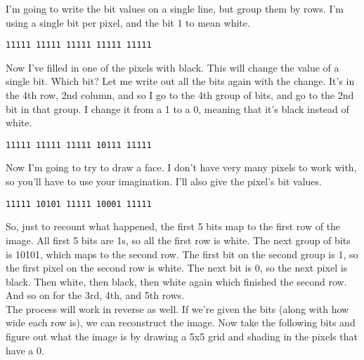 \begin{center}\end{center}

I'm going to write the bit values on a single line, but group them by rows. I'm using a single bit per pixel, and the bit 1 to mean white.\\

\begin{verbatim}
11111 11111 11111 11111 11111
\end{verbatim}

Now I've filled in one of the pixels with black. This will change the value of a single bit. Which bit? Let me write out all the bits again with the change. It's in the 4th row, 2nd column, and so I go to the 4th group of bits, and go to the 2nd bit in that group. I change it from a 1 to a 0, meaning that it's black instead of white.\\

\begin{center}\end{center}

\begin{verbatim}
11111 11111 11111 10111 11111
\end{verbatim}

Now I'm going to try to draw a face. I don't have very many pixels to work with, so you'll have to use your imagination. I'll also give the pixel's bit values.

\begin{center}\end{center}

\begin{verbatim}
11111 10101 11111 10001 11111
\end{verbatim}

So, just to recount what happened, the first 5 bits map to the first row of the image. All first 5 bits are 1s, so all the first row is white. The next group of bits is 10101, which maps to the second row. The first bit on the second group is 1, so the first pixel on the second row is white. The next bit is 0, so the next pixel is black. Then white, then black, then white again which finished the second row. And so on for the 3rd, 4th, and 5th rows.\\

The process will work in reverse as well. If we're given the bits (along with how wide each row is), we can reconstruct the image. Now take the following bits and figure out what the image is by drawing a 5x5 grid and shading in the pixels that have a 0.

